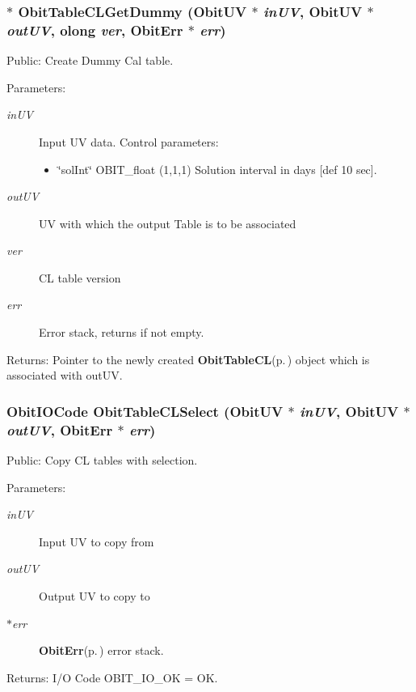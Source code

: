 \subsubsection{$\ast$ Obit\-Table\-CLGet\-Dummy ({\bf Obit\-UV} $\ast$ {\em in\-UV}, {\bf Obit\-UV} $\ast$ {\em out\-UV}, {\bf olong} {\em ver}, {\bf Obit\-Err} $\ast$ {\em err})}\label{ObitTableCLUtil_8h_a1}


Public: Create Dummy Cal table. 

\begin{Desc}
\item[Parameters:]
\begin{description}
\item[{\em in\-UV}]Input UV data. Control parameters: \begin{itemize}
\item \char`\"{}sol\-Int\char`\"{} OBIT\_\-float (1,1,1) Solution interval in days [def 10 sec]. \end{itemize}
\item[{\em out\-UV}]UV with which the output Table is to be associated \item[{\em ver}]CL table version \item[{\em err}]Error stack, returns if not empty. \end{description}
\end{Desc}
\begin{Desc}
\item[Returns:]Pointer to the newly created {\bf Obit\-Table\-CL}{\rm (p.\,\pageref{structObitTableCL})} object which is associated with out\-UV. \end{Desc}
\subsubsection{\setlength{\rightskip}{0pt plus 5cm}Obit\-IOCode Obit\-Table\-CLSelect ({\bf Obit\-UV} $\ast$ {\em in\-UV}, {\bf Obit\-UV} $\ast$ {\em out\-UV}, {\bf Obit\-Err} $\ast$ {\em err})}\label{ObitTableCLUtil_8h_a0}


Public: Copy CL tables with selection. 

\begin{Desc}
\item[Parameters:]
\begin{description}
\item[{\em in\-UV}]Input UV to copy from \item[{\em out\-UV}]Output UV to copy to \item[{\em $\ast$err}]{\bf Obit\-Err}{\rm (p.\,\pageref{structObitErr})} error stack. \end{description}
\end{Desc}
\begin{Desc}
\item[Returns:]I/O Code OBIT\_\-IO\_\-OK = OK. \end{Desc}
